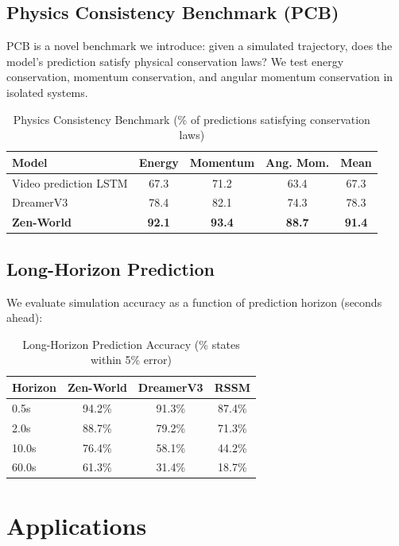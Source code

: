 \documentclass[11pt,a4paper]{article}
\begin{document}
\subsection{Physics Consistency Benchmark (PCB)}

PCB is a novel benchmark we introduce: given a simulated trajectory, does the model's prediction
satisfy physical conservation laws? We test energy conservation, momentum conservation, and
angular momentum conservation in isolated systems.

\begin{table}[H]
\centering
\begin{tabular}{lcccc}
\toprule
\textbf{Model} & \textbf{Energy} & \textbf{Momentum} & \textbf{Ang. Mom.} & \textbf{Mean} \\
\midrule
Video prediction LSTM & 67.3 & 71.2 & 63.4 & 67.3 \\
DreamerV3 & 78.4 & 82.1 & 74.3 & 78.3 \\
\textbf{Zen-World} & \textbf{92.1} & \textbf{93.4} & \textbf{88.7} & \textbf{91.4} \\
\bottomrule
\end{tabular}
\caption{Physics Consistency Benchmark (\% of predictions satisfying conservation laws)}
\end{table}

\subsection{Long-Horizon Prediction}

We evaluate simulation accuracy as a function of prediction horizon (seconds ahead):

\begin{table}[H]
\centering
\begin{tabular}{lccc}
\toprule
\textbf{Horizon} & \textbf{Zen-World} & \textbf{DreamerV3} & \textbf{RSSM} \\
\midrule
0.5s & 94.2\% & 91.3\% & 87.4\% \\
2.0s & 88.7\% & 79.2\% & 71.3\% \\
10.0s & 76.4\% & 58.1\% & 44.2\% \\
60.0s & 61.3\% & 31.4\% & 18.7\% \\
\bottomrule
\end{tabular}
\caption{Long-Horizon Prediction Accuracy (\% states within 5\% error)}
\end{table}

\section{Applications}
\end{document}
